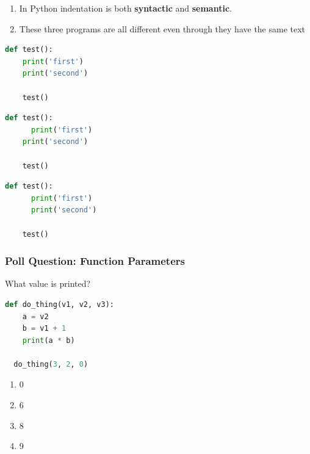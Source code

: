 \documentclass{beamer}
\begin{document}
%
%
\begin{frame}[fragile]
  \centering
  \begin{enumerate}[A]
    \item In Python indentation is both \textbf{syntactic} and \textbf{semantic}.
    \item These three programs are all different even through they have the same text
  \end{enumerate}
  \vfill
  \begin{minipage}{0.29\textwidth}
    \centering
    \begin{lstlisting}[language=Python, autogobble]
    def test():
    print('first')
    print('second')

    test()
    \end{lstlisting}
  \end{minipage}
  \hfill
  \begin{minipage}{0.29\textwidth}
    \centering
    \begin{lstlisting}[language=Python, autogobble]
    def test():
      print('first')
    print('second')

    test()
    \end{lstlisting}
  \end{minipage}
  \hfill
  \begin{minipage}{0.29\textwidth}
    \centering
    \begin{lstlisting}[language=Python, autogobble]
    def test():
      print('first')
      print('second')

    test()
    \end{lstlisting}
  \end{minipage}
\end{frame}

%
%
\begin{frame}[fragile]
  \frametitle{Poll Question: Function Parameters}
  What value is printed?
  \begin{lstlisting}[language=Python, autogobble]
  def do_thing(v1, v2, v3):
    a = v2
    b = v1 + 1
    print(a * b)

  do_thing(3, 2, 0)
  \end{lstlisting}
  \vfill
  \begin{enumerate}[A]
    \item 0
    \item 6
    \item 8 %
    \item 9
  \end{enumerate}
\end{frame}
\end{document}
